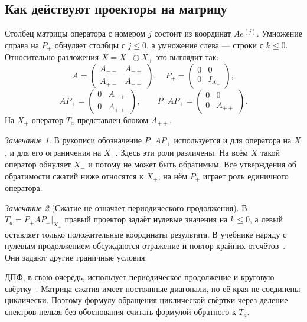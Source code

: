 \documentclass[12pt,a4paper]{article}
\theoremstyle{definition}
\theoremstyle{remark}
\newtheorem*{remark}{Замечание}
\begin{document}
\subsection{Как действуют проекторы на матрицу}

Столбец матрицы оператора с номером $j$ состоит из координат $Ae^{(j)}$.
Умножение справа на $P_+$ обнуляет столбцы с $j\leqslant0$,
а умножение слева --- строки с $k\leqslant0$.
Относительно разложения $X=X_-\oplus X_+$ это выглядит так:
\[
  A=\begin{pmatrix}A_{--}&A_{-+}\\A_{+-}&A_{++}\end{pmatrix},
  \quad
  P_+=\begin{pmatrix}0&0\\0&I_{X_+}\end{pmatrix},
\]
\[
  AP_+=\begin{pmatrix}0&A_{-+}\\0&A_{++}\end{pmatrix},\qquad
  P_+AP_+=\begin{pmatrix}0&0\\0&A_{++}\end{pmatrix}.
\]
На $X_+$ оператор $T_a$ представлен блоком $A_{++}$.

\begin{remark}
В рукописи обозначение $P_+AP_+$ используется и для оператора на $X$,
и для его ограничения на $X_+$. Здесь эти роли различены.
На всём $X$ такой оператор обнуляет $X_-$ и потому не может быть
обратимым. Все утверждения об обратимости сжатий ниже относятся
к $X_+$; на нём $P_+$ играет роль единичного оператора.
\end{remark}

\begin{remark}[Сжатие не означает периодического продолжения]
В $T_a=P_+AP_+|_{X_+}$ правый проектор задаёт нулевые значения
на $k\leqslant0$, а левый оставляет только положительные координаты
результата. В учебнике наряду с нулевым продолжением обсуждаются
отражение и повтор крайних отсчётов~\cite[\S\,3.4.2, с.~190]{GW2012}.
Они задают другие граничные условия.

ДПФ, в свою очередь, использует периодическое продолжение и
круговую свёртку~\cite[\S\,4.4.1, с.~269--271]{GW2012}.
Матрица сжатия имеет постоянные диагонали, но её края не соединены
циклически. Поэтому формулу обращения циклической свёртки
через деление спектров нельзя без обоснования считать формулой
обратного к $T_a$.
\end{remark}
\end{document}
